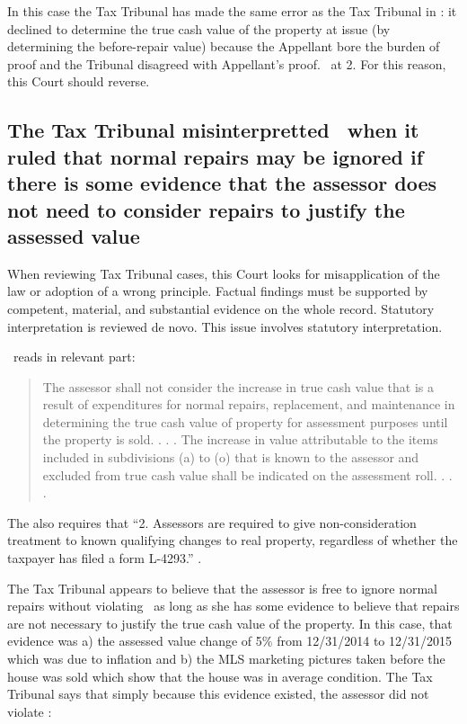 \documentclass[12pt,\documentclassflag]{michiganCourtOfAppealsBrief}
\def\mathieuGast{\pincite[l]{MCL}{211.27(2)}}
\begin{document}
In this case the Tax Tribunal has made the same error as the Tax Tribunal in \cite[s]{Jones & Laughlin}: it declined to determine the true cash value of the property at issue (by determining the before-repair value) because the Appellant bore the burden of proof and the Tribunal disagreed with Appellant's proof. \orderDenying\ at 2. For this reason, this Court should reverse.

\subsection{The Tax Tribunal misinterpretted \mathieuGast\ when it ruled that normal repairs may be ignored if there is some evidence that the assessor does not need to consider repairs to justify the assessed value}

When reviewing Tax Tribunal cases, this Court looks for misapplication of the law or adoption of a wrong principle. Factual findings must be supported by competent, material, and substantial evidence on the whole record. Statutory interpretation is reviewed de novo.  This issue involves statutory interpretation.

\mathieuGast\ reads in relevant part:

\begin{quote}
	The assessor shall not consider the increase in true cash value that is a result of expenditures for normal repairs, replacement, and maintenance in determining the true cash value of property for assessment purposes until the property is sold. . . . The increase in value attributable to the items included in subdivisions (a) to (o) that is known to the assessor and excluded from true cash value shall be indicated on the assessment roll. . . .
\end{quote}

The \STC also requires that ``2. Assessors are required to give non-consideration treatment to known qualifying changes to real property, regardless of whether the taxpayer has filed a form L-4293.'' .

The Tax Tribunal appears to believe that the assessor is free to ignore normal repairs without violating \mathieuGast\ as long as she has some evidence to believe that repairs are not necessary to justify the true cash value of the property. In this case, that evidence was a) the assessed value change of 5\% from 12/31/2014 to 12/31/2015 which was due to inflation and b) the MLS marketing pictures taken before the house was sold which show that the house was in average condition. The Tax Tribunal says that simply because this evidence existed, the assessor did not violate \mathieuGast: 
\end{document}
